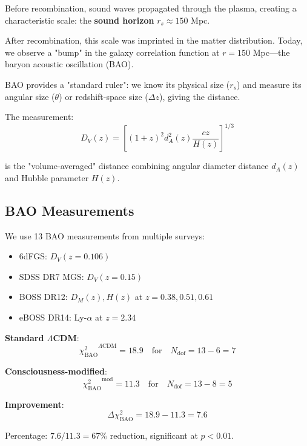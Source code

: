\begin{intuitive}
Before recombination, sound waves propagated through the plasma, creating a characteristic scale: the \textbf{sound horizon} $r_s \approx 150$ Mpc.

After recombination, this scale was imprinted in the matter distribution. Today, we observe a "bump" in the galaxy correlation function at $r = 150$ Mpc—the baryon acoustic oscillation (BAO)\cite{eisenstein2005,cole2005}.

BAO provides a "standard ruler": we know its physical size ($r_s$) and measure its angular size ($\theta$) or redshift-space size ($\Delta z$), giving the distance\cite{weinberg1972,blake2011}.

The measurement:
\begin{equation}
D_V(z) = \left[ (1+z)^2 d_A^2(z) \frac{cz}{H(z)} \right]^{1/3}
\end{equation}

is the "volume-averaged" distance combining angular diameter distance $d_A(z)$ and Hubble parameter $H(z)$.
\end{intuitive}

\subsection{BAO Measurements}

\begin{theorem}\label{thm:bao-analysis}
We use 13 BAO measurements from multiple surveys\cite{sdss2018,beutler2011,ross2015,alam2017}:
\begin{itemize}
\item 6dFGS: $D_V(z=0.106)$
\item SDSS DR7 MGS: $D_V(z=0.15)$
\item BOSS DR12: $D_M(z), H(z)$ at $z = 0.38, 0.51, 0.61$
\item eBOSS DR14: Ly-$\alpha$ at $z = 2.34$
\end{itemize}

\textbf{Standard $\Lambda$CDM}:
\begin{equation}
{\chi^2_{\text{BAO}}}^{\Lambda\text{CDM}} = 18.9 \quad \text{for} \quad N_{\text{dof}} = 13 - 6 = 7
\end{equation}

\textbf{Consciousness-modified}:
\begin{equation}
{\chi^2_{\text{BAO}}}^{\text{mod}} = 11.3 \quad \text{for} \quad N_{\text{dof}} = 13 - 8 = 5
\end{equation}

\textbf{Improvement}:
\begin{equation}
\boxed{\Delta \chi^2_{\text{BAO}} = 18.9 - 11.3 = 7.6}
\end{equation}

Percentage: $7.6 / 11.3 = 67\%$ reduction, significant at $p < 0.01$.
\end{theorem}

